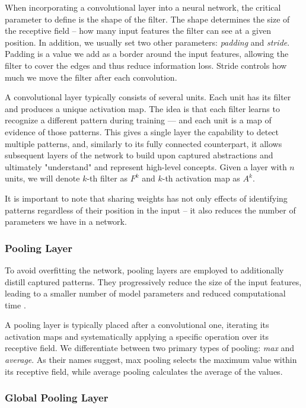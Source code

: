 When incorporating a convolutional layer into a neural network, the critical parameter to define is the shape of the filter.
The shape determines the size of the receptive field -- how many input features the filter can see at a given position.
In addition, we usually set two other parameters: \emph{padding} and \emph{stride}.
Padding is a value we add as a border around the input features, allowing the filter to cover the edges and thus reduce information loss.
Stride controls how much we move the filter after each convolution.

A convolutional layer typically consists of several units.
Each unit has its filter and produces a unique activation map.
The idea is that each filter learns to recognize a different pattern during training --- and each unit is a map of evidence of those patterns.
This gives a single layer the capability to detect multiple patterns, and, similarly to its fully connected counterpart, it allows subsequent layers of the network to build upon captured abstractions and ultimately "understand" and represent high-level concepts.
Given a layer with $n$ units, we will denote $k$-th filter as $F^k$ and $k$-th activation map as $A^k$.

It is important to note that sharing weights has not only effects of identifying patterns regardless of their position in the input -- it also reduces the number of parameters we have in a network.

\subsubsection{Pooling Layer}

To avoid overfitting the network, pooling layers are employed to additionally distill captured patterns.
They progressively reduce the size of the input features, leading to a smaller number of model parameters and reduced computational time \cite{cnns}.

A pooling layer is typically placed after a convolutional one, iterating its activation maps and systematically applying a specific operation over its receptive field.
We differentiate between two primary types of pooling: \emph{max} and \emph{average}.
As their names suggest, max pooling selects the maximum value within its receptive field, while average pooling calculates the average of the values.

\subsubsection{Global Pooling Layer}

